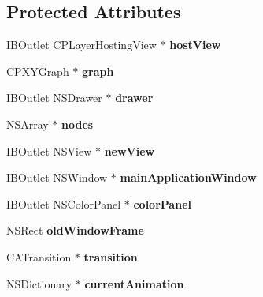 \subsection*{Protected Attributes}
\begin{DoxyCompactItemize}
\item 
\hypertarget{interface_core_plot_view_a189a776fdd822f86214a9a38da5bf382}{
IBOutlet CPLayerHostingView $\ast$ {\bfseries hostView}}
\label{interface_core_plot_view_a189a776fdd822f86214a9a38da5bf382}

\item 
\hypertarget{interface_core_plot_view_a4150faa40c595cb78468599a45c0f46c}{
CPXYGraph $\ast$ {\bfseries graph}}
\label{interface_core_plot_view_a4150faa40c595cb78468599a45c0f46c}

\item 
\hypertarget{interface_core_plot_view_a9ccbe44bc3e72a5781158a95e5a0a42d}{
IBOutlet NSDrawer $\ast$ {\bfseries drawer}}
\label{interface_core_plot_view_a9ccbe44bc3e72a5781158a95e5a0a42d}

\item 
\hypertarget{interface_core_plot_view_ac4ed97ca2f531da3e0997862460f2aa5}{
NSArray $\ast$ {\bfseries nodes}}
\label{interface_core_plot_view_ac4ed97ca2f531da3e0997862460f2aa5}

\item 
\hypertarget{interface_core_plot_view_aa1775417b92cbd5bfe556bafc26de2d0}{
IBOutlet NSView $\ast$ {\bfseries newView}}
\label{interface_core_plot_view_aa1775417b92cbd5bfe556bafc26de2d0}

\item 
\hypertarget{interface_core_plot_view_a1ed29f41b2cf782ee85f5653358b8b39}{
IBOutlet NSWindow $\ast$ {\bfseries mainApplicationWindow}}
\label{interface_core_plot_view_a1ed29f41b2cf782ee85f5653358b8b39}

\item 
\hypertarget{interface_core_plot_view_a604926315a909c854d2c05800f25f574}{
IBOutlet NSColorPanel $\ast$ {\bfseries colorPanel}}
\label{interface_core_plot_view_a604926315a909c854d2c05800f25f574}

\item 
\hypertarget{interface_core_plot_view_afcc27a46ac36fd56ef44a703544e90eb}{
NSRect {\bfseries oldWindowFrame}}
\label{interface_core_plot_view_afcc27a46ac36fd56ef44a703544e90eb}

\item 
\hypertarget{interface_core_plot_view_a56915bdd37e16430bda38a3e265469ca}{
CATransition $\ast$ {\bfseries transition}}
\label{interface_core_plot_view_a56915bdd37e16430bda38a3e265469ca}

\item 
\hypertarget{interface_core_plot_view_a6f16198286bb9ab080b462a8f7504f10}{
NSDictionary $\ast$ {\bfseries currentAnimation}}
\label{interface_core_plot_view_a6f16198286bb9ab080b462a8f7504f10}

\end{DoxyCompactItemize}
